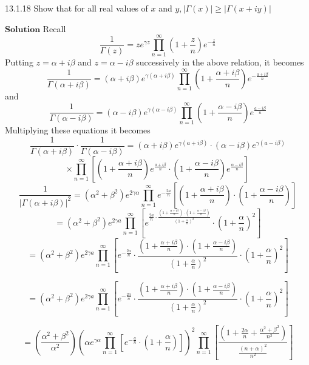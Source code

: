 \documentclass{article}
\begin{document}
\begin{flushleft}
\begin{mybox}{13.1.18}
Show that for all real values of $x$ and $y,|\Gamma(x)| \geq|\Gamma(x+i y)|$
\end{mybox}


$\boxed{\textbf{Solution}}$ Recall 
$$
\frac{1}{\Gamma(z)}=z e^{\gamma z} \prod_{n=1}^{\infty}\left(1+\frac{z}{n}\right) e^{-\frac{z}{n}}
$$
Putting $z=\alpha+i \beta$ and $z=\alpha-i \beta$ successively in the above relation, it becomes
$$
\frac{1}{\Gamma(\alpha+i \beta)}=(\alpha+i \beta) e^{\gamma(\alpha+i \beta)} \prod_{n=1}^{\infty}\left(1+\frac{\alpha+i \beta}{n}\right) e^{-\frac{a+i \beta}{n}}
$$
and 
$$
\frac{1}{\Gamma(\alpha-i \beta)}=(\alpha-i \beta) e^{\gamma(\alpha-i \beta)} \prod_{n=1}^{\infty}\left(1+\frac{\alpha-i \beta}{n}\right) e^{\frac{a-i \beta}{n}}
$$
Multiplying these equations it becomes
$$
\frac{1}{\Gamma(\alpha+i \beta)} \cdot \frac{1}{\Gamma(\alpha-i \beta)}=(\alpha+i \beta) e^{\gamma(a+i \beta)} \cdot(\alpha-i \beta) e^{\gamma(a-i \beta)}$$
$$\times \prod_{n=1}^{\infty}\left[\left(1+\frac{\alpha+i \beta}{n}\right) e^{\frac{a+i \beta}{n}} \cdot\left(1+\frac{\alpha-i \beta}{n}\right) e^{\frac{\alpha-i \beta}{n}}\right]
$$
$$
\frac{1}{|\Gamma(\alpha+i \beta)|^{2}}=\left(\alpha^{2}+\beta^{2}\right) e^{2\gamma \alpha} \prod_{n=1}^{\infty} e^{-\frac{2 a}{n}}\left[\left(1+\frac{\alpha+i \beta}{n}\right) \cdot\left(1+\frac{\alpha-i \beta}{n}\right)\right]
$$
$$
=\left(\alpha^{2}+\beta^{2}\right) e^{2 \gamma a} \prod_{n=1}^{\infty}\left[e^{\frac{2 a}{n} \cdot \frac{\left(1+\frac{\alpha+i \beta}{n}\right) \cdot\left(1+\frac{\alpha-i \beta}{n}\right)}{\left(1+\frac{\alpha}{n}\right)^{2}}} \cdot\left(1+\frac{\alpha}{n}\right)^{2}\right]
$$
$$
=\left(\alpha^{2}+\beta^{2}\right) e^{2 \gamma a} \prod_{n=1}^{\infty}\left[e^{-\frac{2 a}{n}} \cdot \frac{\left(1+\frac{\alpha+i \beta}{n}\right) \cdot\left(1+\frac{\alpha-i \beta}{n}\right)}{\left(1+\frac{\alpha}{n}\right)^{2}} \cdot\left(1+\frac{\alpha}{n}\right)^{2}\right]
$$

$$
=\left(\alpha^{2}+\beta^{2}\right) e^{2 \gamma a} \prod_{n=1}^{\infty}\left[e^{-\frac{2 a}{n}} \cdot \frac{\left(1+\frac{\alpha+i \beta}{n}\right) \cdot\left(1+\frac{\alpha-i \beta}{n}\right)}{\left(1+\frac{\alpha}{n}\right)^{2}} \cdot\left(1+\frac{\alpha}{n}\right)^{2}\right]
$$

$$
=\left(\frac{\alpha^{2}+\beta^{2}}{\alpha^{2}}\right)\left(\alpha e^{\gamma \alpha} \prod_{n=1}^{\infty}\left[e^{-\frac{a}{n}} \cdot\left(1+\frac{\alpha}{n}\right)\right]\right)^{2} \prod_{n=1}^{\infty}\left[\frac{\left(1+\frac{2 \alpha}{n}+\frac{\alpha^{2}+\beta^{2}}{n^{2}}\right)}{\frac{(n+\alpha)^{2}}{n^{2}}}\right]
$$



\end{flushleft}
\end{document}
